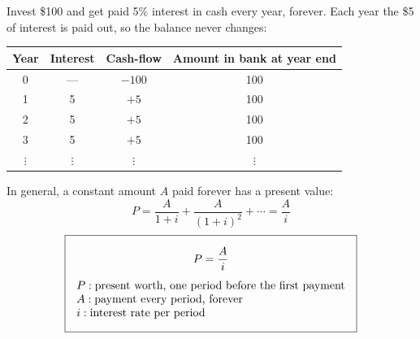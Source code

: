 \begin{example}
    Invest \$100 and get paid 5\% interest in cash every year, forever.
    Each year the \$5 of interest is paid out, so the balance never changes:
    \begin{center}
    \begin{tabular}{cccc}
        \toprule
        Year & Interest & Cash-flow & Amount in bank at year end \\
        \midrule
        0 & --- & $-100$ & 100 \\
        1 & 5 & $+5$ & 100 \\
        2 & 5 & $+5$ & 100 \\
        3 & 5 & $+5$ & 100 \\
        $\vdots$ & $\vdots$ & $\vdots$ & $\vdots$ \\
        \bottomrule
    \end{tabular}
    \end{center}
     In general, a constant amount $A$ paid forever has a  present value:
    \[P = \frac{A}{1+i}+\frac{A}{(1+i)^2}+\cdots = \frac{A}{i}\]
    \[\boxed{\begin{gathered}
        P = \frac{A}{i}\\[4pt]
        \begin{array}{@{}l@{}}
            P: \text{present worth, one period before the first payment}\\
            A: \text{payment every period, forever}\\
            i: \text{interest rate per period}
        \end{array}
    \end{gathered}}\]
\end{example}

